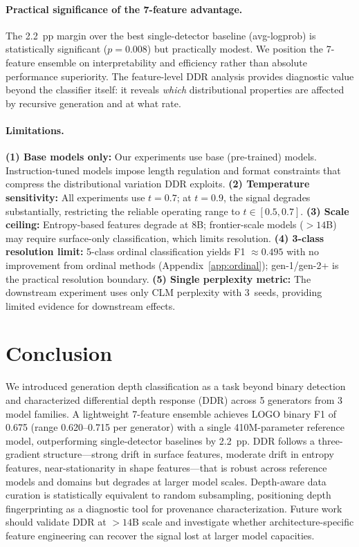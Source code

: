 \documentclass[11pt,a4paper]{article}
\begin{document}
\paragraph{Practical significance of the 7-feature advantage.}
The 2.2~pp margin over the best single-detector baseline (avg-logprob) is statistically significant ($p = 0.008$) but practically modest.
We position the 7-feature ensemble on interpretability and efficiency rather than absolute performance superiority.
The feature-level DDR analysis provides diagnostic value beyond the classifier itself: it reveals \emph{which} distributional properties are affected by recursive generation and at what rate.

\paragraph{Limitations.}
\textbf{(1) Base models only:} Our experiments use base (pre-trained) models. Instruction-tuned models impose length regulation and format constraints that compress the distributional variation DDR exploits.
\textbf{(2) Temperature sensitivity:} All experiments use $t = 0.7$; at $t = 0.9$, the signal degrades substantially, restricting the reliable operating range to $t \in [0.5, 0.7]$.
\textbf{(3) Scale ceiling:} Entropy-based features degrade at 8B; frontier-scale models ($> 14$B) may require surface-only classification, which limits resolution.
\textbf{(4) 3-class resolution limit:} 5-class ordinal classification yields F1 $\approx 0.495$ with no improvement from ordinal methods (Appendix~\ref{app:ordinal}); gen-1/gen-2+ is the practical resolution boundary.
\textbf{(5) Single perplexity metric:} The downstream experiment uses only CLM perplexity with 3~seeds, providing limited evidence for downstream effects.

\section{Conclusion}

We introduced generation depth classification as a task beyond binary detection and characterized differential depth response (DDR) across 5 generators from 3 model families.
A lightweight 7-feature ensemble achieves LOGO binary F1 of 0.675 (range 0.620--0.715 per generator) with a single 410M-parameter reference model, outperforming single-detector baselines by 2.2~pp.
DDR follows a three-gradient structure---strong drift in surface features, moderate drift in entropy features, near-stationarity in shape features---that is robust across reference models and domains but degrades at larger model scales.
Depth-aware data curation is statistically equivalent to random subsampling, positioning depth fingerprinting as a diagnostic tool for provenance characterization.
Future work should validate DDR at $> 14$B scale and investigate whether architecture-specific feature engineering can recover the signal lost at larger model capacities.
\end{document}
